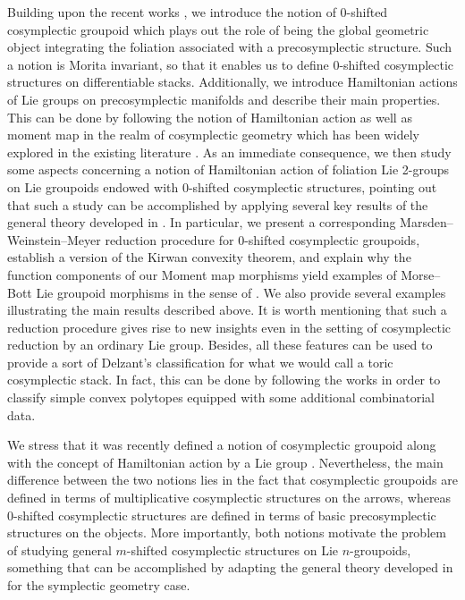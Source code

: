 \documentclass[
  a4paper, 
  reqno, 
  oneside, 
  12pt
]{amsart}
\theoremstyle{definition}
\theoremstyle{remark}
\begin{document}
Building upon the recent works \cite{HoffmanSjamaar,LinSjamaar,MaglioTortorellaVitagliano}, we introduce the notion of 0-shifted cosymplectic groupoid which plays out the role of being the global geometric object integrating the foliation associated with a precosymplectic structure. Such a notion is Morita invariant, so that it enables us to define 0-shifted cosymplectic structures on differentiable stacks. Additionally, we introduce Hamiltonian actions of Lie groups on precosymplectic manifolds and describe their main properties. This can be done by following the notion of Hamiltonian action as well as moment map in the realm of cosymplectic geometry which has been widely explored in the existing literature \cite{Albert,BazzoniGoertsches,BazzoniGoertsches2,deLucasRivasVilarinoZawora}. As an immediate consequence, we then study some aspects concerning a notion of Hamiltonian action of foliation Lie 2-groups on Lie groupoids endowed with 0-shifted cosymplectic structures, pointing out that such a study can be accomplished by applying several key results of the general theory developed in \cite{HoffmanSjamaar}. In particular, we present a corresponding Marsden--Weinstein--Meyer reduction procedure for 0-shifted cosymplectic groupoids, establish a version of the Kirwan convexity theorem, and explain why the function components of our Moment map morphisms yield examples of Morse–Bott Lie groupoid morphisms in the sense of \cite{OrtizValencia}. We also provide several examples illustrating the main results described above. It is worth mentioning that such a reduction procedure gives rise to new insights even in the setting of cosymplectic reduction by an ordinary Lie group. Besides, all these features can be used to provide a sort of Delzant's classification for what we would call a toric cosymplectic stack. In fact, this can be done by following the works \cite{BazzoniGoertsches2,Hoffman} in order to classify simple convex polytopes equipped with some additional combinatorial data.

We stress that it was recently defined a notion of cosymplectic groupoid \cite{FernandesIglesias} along with the concept of Hamiltonian action by a Lie group \cite{LopezGarciaMartinez}. Nevertheless, the main difference between the two notions lies in the fact that cosymplectic groupoids are defined in terms of multiplicative cosymplectic structures on the arrows, whereas 0-shifted cosymplectic structures are defined in terms of basic precosymplectic structures on the objects. More importantly, both notions motivate the problem of studying general $m$-shifted cosymplectic structures on Lie $n$-groupoids, something that can be accomplished by adapting the general theory developed in \cite{CuecaZhu} for the symplectic geometry case.
\end{document}
